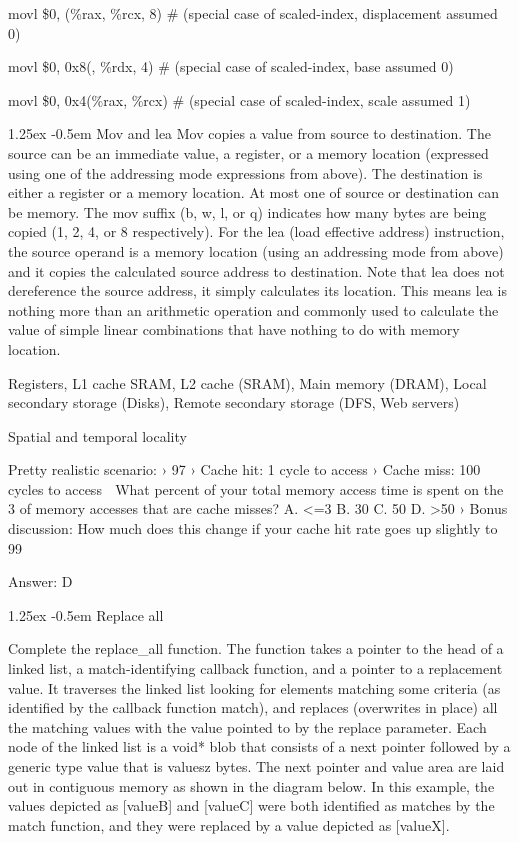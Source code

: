 \documentclass[10pt]{article}
\makeatletter
\newlength{\norm}
\newlength{\nrm}
\renewcommand{\paragraph}{%
  \@startsection{paragraph}{4}%
  {\z@}{1.25ex \@plus 2pt \@minus 2pt}{-0.5em}%
  {\fontsize{\f@size}{\nrm}\normalfont\bfseries}%
}
\makeatother
\begin{document}
{\begin{multicols*}{5}
movl \$0, (\%rax, \%rcx, 8)     # (special case of scaled-index, displacement assumed 0)

movl \$0, 0x8(, \%rdx, 4)     # (special case of scaled-index, base assumed 0)

movl \$0, 0x4(\%rax, \%rcx)      # (special case of scaled-index, scale assumed 1)

\paragraph{Mov and lea} Mov copies a value from source to destination. The source can be an immediate value, a register, or a memory location (expressed using one of the addressing mode expressions from above). The destination is either a register or a memory location. At most one of source or destination can be memory. The mov suffix (b, w, l, or q) indicates how many bytes are being copied (1, 2, 4, or 8 respectively). For the lea (load effective address) instruction, the source operand is a memory location (using an addressing mode from above) and it copies the calculated source address to destination. Note that lea does not dereference the source address, it simply calculates its location. This means lea is nothing more than an arithmetic operation and commonly used to calculate the value of simple linear combinations that have nothing to do with memory location.


Registers, L1 cache SRAM, L2 cache (SRAM), Main memory (DRAM), Local secondary storage (Disks), Remote secondary storage (DFS, Web servers)

Spatial and temporal locality

Pretty realistic scenario:
› 97%
› Cache hit: 1 cycle to access
› Cache miss: 100 cycles to access
 What percent of your total memory access time is spent on the 3%
of memory accesses that are cache misses?
A. <=3%
B. 30%
C. 50%
D. >50%
› Bonus discussion: How much does this change if your cache hit rate
goes up slightly to 99%


Answer: D

\paragraph{Replace all}

Complete the replace\_all function. The function takes a pointer to the head of a linked list, a
match-identifying callback function, and a pointer to a replacement value. It traverses the
linked list looking for elements matching some criteria (as identified by the callback function
match), and replaces (overwrites in place) all the matching values with the value pointed to by
the replace parameter.
Each node of the linked list is a void* blob that consists of a next pointer followed by a generic
type value that is valuesz bytes. The next pointer and value area are laid out in contiguous
memory as shown in the diagram below. In this example, the values depicted as [valueB] and
[valueC] were both identified as matches by the match function, and they were replaced by a
value depicted as [valueX].


\end{multicols*}}
\end{document}
